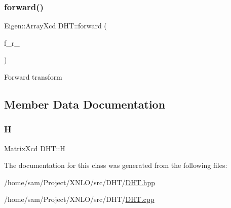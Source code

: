 \subsubsection{\texorpdfstring{forward()}{forward()}}
{\footnotesize\ttfamily Eigen\+::\+Array\+Xcd D\+H\+T\+::forward (\begin{DoxyParamCaption}\item[{Eigen\+::\+Array\+Xcd}]{f\+\_\+r\+\_\+ }\end{DoxyParamCaption})}

Forward transform 

\subsection{Member Data Documentation}
\mbox{\label{class_d_h_t_ac17a580b606f25c937dbdc81dba517d7}} 
\subsubsection{\texorpdfstring{H}{H}}
{\footnotesize\ttfamily Matrix\+Xcd D\+H\+T\+::H}



The documentation for this class was generated from the following files\+:\begin{DoxyCompactItemize}
\item 
/home/sam/\+Project/\+X\+N\+L\+O/src/\+D\+H\+T/\hyperlink{_d_h_t_8hpp}{D\+H\+T.\+hpp}\item 
/home/sam/\+Project/\+X\+N\+L\+O/src/\+D\+H\+T/\hyperlink{_d_h_t_8cpp}{D\+H\+T.\+cpp}\end{DoxyCompactItemize}
